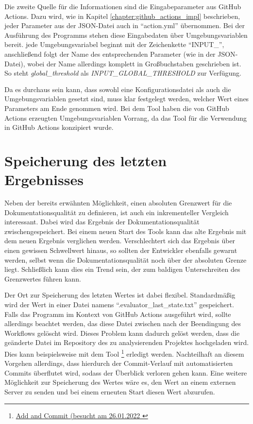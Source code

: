 Die zweite Quelle für die Informationen sind die Eingabeparameter aus GitHub Actions. Dazu wird, wie in Kapitel \ref{chapter:github_actions_impl} beschrieben, jeder Parameter aus der \ac{JSON}-Datei auch in \enquote{action.yml} übernommen. Bei der Ausführung des Programms stehen diese Eingabedaten über Umgebungsvariablen bereit. jede Umgebungsvariabel beginnt mit der Zeichenkette \enquote{INPUT\_}, anschließend folgt der Name des entsprechenden Parameter (wie in der \ac{JSON}-Datei), wobei der Name allerdings komplett in Großbuchstaben geschrieben ist. So steht  \textit{global\_threshold} als \textit{INPUT\_GLOBAL\_THRESHOLD} zur Verfügung.

Da es durchaus sein kann, dass sowohl eine Konfigurationsdatei als auch die Umgebungsvariablen gesetzt sind, muss klar festgelegt werden, welcher Wert eines Parameters am Ende genommen wird. Bei dem Tool haben die von GitHub Actions erzeugten Umgebungsvariablen  Vorrang, da das Tool für die Verwendung in GitHub Actions konzipiert wurde. 

\section{Speicherung des letzten Ergebnisses}\label{chapter:saving}
Neben der bereits erwähnten Möglichkeit, einen absoluten Grenzwert für die Dokumentationsqualität zu definieren, ist auch ein inkrementeller Vergleich interessant. Dabei wird das Ergebnis der Dokumentationsqualität zwischengespeichert. Bei einem neuen Start des Tools kann das alte Ergebnis mit dem neuen Ergebnis verglichen werden. Verschlechtert sich das Ergebnis über einen gewissen Schwellwert hinaus, so sollten der Entwickler ebenfalls gewarnt werden, selbst wenn die Dokumentationsqualität noch über der absoluten Grenze liegt. Schließlich kann dies ein Trend sein, der zum baldigen Unterschreiten des Grenzwertes führen kann. 

Der Ort zur Speicherung des letzten Wertes ist dabei flexibel. Standardmäßig wird der Wert in einer Datei namens \enquote{.evaluator\_last\_state.txt} gespeichert. Falls das Programm im Kontext von GitHub Actions ausgeführt wird, sollte allerdings beachtet werden, das diese Datei zwischen nach der Beendingung des Workflows gelöscht wird. Dieses Problem kann dadurch gelöst werden, dass die geänderte Datei im Repository des zu analysierenden Projektes hochgeladen wird. Dies kann beispielsweise mit dem Tool \footnote{\href{https://github.com/EndBug/add-and-commit}{Add and Commit (besucht am 26.01.2022 }} erledigt werden. Nachteilhaft an diesem Vorgehen allerdings, dass hierdurch der Commit-Verlauf mit automatisierten Commits überflutet wird, sodass der Überblick verloren gehen kann.  Eine weitere Möglichkeit zur Speicherung des Wertes wäre es, den Wert an einem externen Server zu senden und bei einem erneuten Start diesen Wert abzurufen. 

